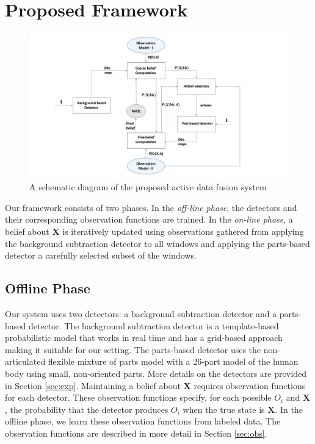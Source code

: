 \documentclass[10pt,twocolumn,letterpaper]{article}
\begin{document}
\section{Proposed Framework}
\begin{figure}
\begin{center}
\includegraphics[width=12cm]{img/newBlockdia.jpg}
\end{center}
\caption{A schematic diagram of the proposed active data fusion system}
\label{fig:Block dia}
\end{figure}
Our framework consists of two phases. In the \emph{off-line phase}, the detectors and their corresponding observation functions are trained. In the \emph{on-line phase}, a belief about $\mathbf{X}$ is iteratively updated using observations gathered from applying the background subtraction detector to all windows and applying the parts-based detector a carefully selected subset of the windows.
\subsection{Offline Phase}
Our system uses two detectors: a background subtraction detector and a parts-based detector. The background subtraction detector is a template-based probabilistic model \cite{englebienne2010fast}  that works in real time and has a grid-based approach making it suitable for our setting. The parts-based detector uses the non-articulated flexible mixture of parts model \cite{partsDeva} with a 26-part model of the human body using small, non-oriented parts.
More details on the detectors are provided in Section \ref{sec:exp}.
Maintaining a belief about $\mathbf{X}$ requires observation functions for each detector. These observation functions specify, for each possible $O_i$ and $\mathbf{X}$, the probability that the detector produces $O_i$ when the true state is $\mathbf{X}$. In the offline phase, we learn these observation functions from labeled data. The observation functions are described in more detail in Section \ref{sec:obs}.
\end{document}
